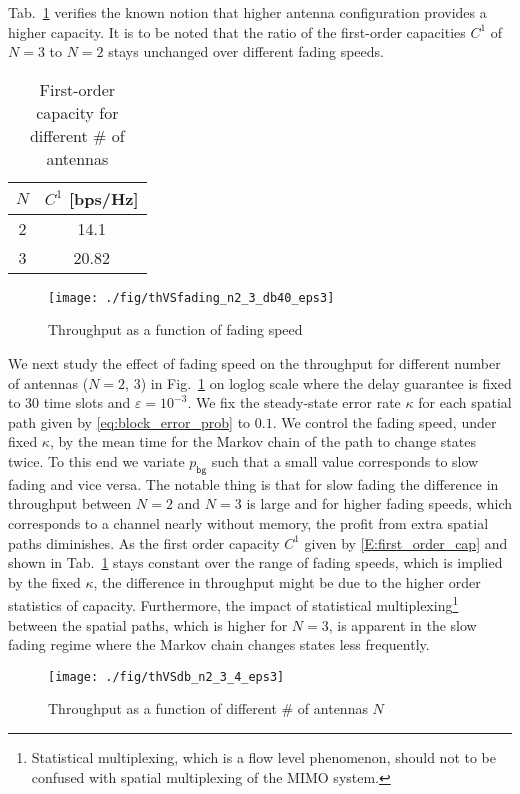 \documentclass[10pt,conference]{IEEEtran}
\begin{document}
Tab.~\ref{tab:fading_meancap} verifies the known notion that higher antenna configuration provides a higher capacity.
It is to be noted that the ratio of the first-order capacities $C^1$ of $N = 3$ to $N = 2$ stays unchanged over different fading speeds.
\begin{table}[tb]
\begin{center}
\caption{First-order capacity for different \# of antennas}
\label{tab:fading_meancap}
\begin{tabular}{|c||c|} \hline
$N$ & $C^1$ [bps/Hz] \\ \hline
2 & 14.1 \\ \hline
3 & 20.82 \\ \hline
\end{tabular}
\end{center}
\end{table}
\begin{figure}[t]
	\centering		 \texttt{[image: ./fig/thVSfading\_n2\_3\_db40\_eps3]}
	\caption{Throughput as a function of fading speed}
	\label{fig:thVSfad}
\end{figure}


We next study the effect of fading speed on the throughput for different number of antennas ($N = 2$, $3$) in Fig.~\ref{fig:thVSfad} on loglog scale where the delay guarantee is fixed to 30 time slots and $\varepsilon = 10^{-3}$.
We fix the steady-state error rate $\kappa$ for each spatial path given by \eqref{eq:block_error_prob} to $0.1$. We control the fading speed, under fixed $\kappa$, by the mean time for the Markov chain of the path to change states twice.
To this end we variate $p_{\mathsf{bg}}$ such that a small value corresponds to slow fading and vice versa.
The notable thing is that for slow fading the difference in throughput between $N = 2$ and $N = 3$ is large and for higher fading speeds, which corresponds to a channel nearly without memory, the profit from extra spatial paths diminishes.
As the first order capacity $C^1$ given by \eqref{E:first_order_cap} and shown in Tab.~\ref{tab:fading_meancap} stays constant over the range of fading speeds, which is implied by the fixed $\kappa$, the difference in throughput might be due to the higher order statistics of capacity.
Furthermore, the impact of statistical multiplexing\footnote{Statistical multiplexing, which is a flow level phenomenon, should not to be confused with spatial multiplexing of the MIMO system.} between the spatial paths, which is higher for $N = 3$, is apparent in the slow fading regime where the Markov chain changes states less frequently.
\begin{figure}[t]
	\centering
		 \texttt{[image: ./fig/thVSdb\_n2\_3\_4\_eps3]}
	\caption{Throughput as a function of different \# of antennas $N$}
	\label{fig:thVSdb_diff_nr_antennas}
\end{figure}
\end{document}
